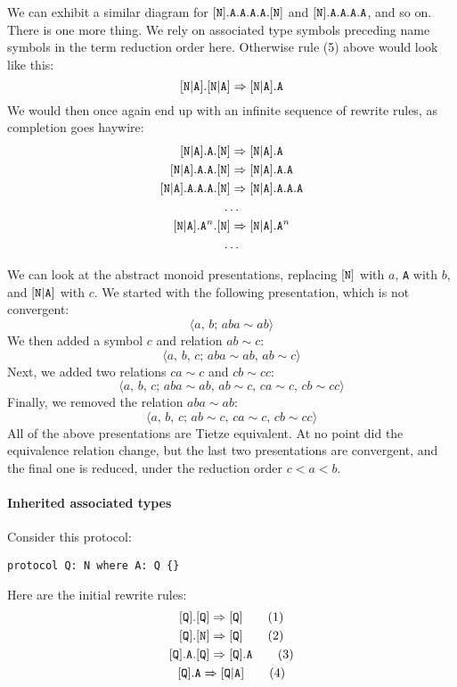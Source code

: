 \documentclass[../generics]{subfiles}
\begin{document}
We can exhibit a similar diagram for $[\texttt{N}].\texttt{A}.\texttt{A}.\texttt{A}.\texttt{A}.[\texttt{N}]$ and $[\texttt{N}].\texttt{A}.\texttt{A}.\texttt{A}.\texttt{A}$, and so on. There is one more thing. We rely on associated type symbols preceding name symbols in the term reduction order here. Otherwise rule (5) above would look like this:
\[[\texttt{N}|\texttt{A}].[\texttt{N}|\texttt{A}]\Rightarrow[\texttt{N}|\texttt{A}].\texttt{A}\]
We would then once again end up with an infinite sequence of rewrite rules, as completion goes haywire:
\begin{gather*}
\assocsym{N}{A}.\texttt{A}.\protosym{N}\Rightarrow\assocsym{N}{A}.\texttt{A}\\
\assocsym{N}{A}.\texttt{A}.\texttt{A}.\protosym{N}\Rightarrow\assocsym{N}{A}.\texttt{A}.\texttt{A}\\
\assocsym{N}{A}.\texttt{A}.\texttt{A}.\texttt{A}.\protosym{N}\Rightarrow\assocsym{N}{A}.\texttt{A}.\texttt{A}.\texttt{A}\\
\ldots\\
\assocsym{N}{A}.\texttt{A}^n.\protosym{N}\Rightarrow\assocsym{N}{A}.\texttt{A}^n\\
\ldots
\end{gather*}

We can look at the abstract monoid presentations, replacing $[\texttt{N}]$ with $a$, \texttt{A} with $b$, and $[\texttt{N}|\texttt{A}]$ with $c$. We started with the following presentation, which is not convergent:
\[\langle a,\,b;\,aba\sim ab\rangle\]
We then added a symbol $c$ and relation $ab\sim c$:
\[\langle a,\,b,\,c;\,aba\sim ab,\,ab\sim c\rangle\]
Next, we added two relations $ca\sim c$ and $cb\sim cc$:
\[\langle a,\,b,\,c;\,aba\sim ab,\,ab\sim c,\,ca\sim c,\,cb\sim cc\rangle\]
Finally, we removed the relation $aba\sim ab$:
\[\langle a,\,b,\,c;\,ab\sim c,\,ca\sim c,\,cb\sim cc\rangle\]
All of the above presentations are Tietze equivalent. At no point did the equivalence relation change, but the last two presentations are convergent, and the final one is reduced, under the reduction order $c<a<b$.

\paragraph{Inherited associated types}
Consider this protocol:
\begin{Verbatim}
protocol Q: N where A: Q {}
\end{Verbatim}
Here are the initial rewrite rules:
\begin{gather*}
\protosym{Q}.\protosym{Q}\Rightarrow\protosym{Q}\tag{1}\\
\protosym{Q}.\protosym{N}\Rightarrow\protosym{Q}\tag{2}\\
\protosym{Q}.\texttt{A}.\protosym{Q}\Rightarrow\protosym{Q}.\texttt{A}\tag{3}\\
\protosym{Q}.\texttt{A}\Rightarrow\assocsym{Q}{A}\tag{4}
\end{gather*}
\end{document}
